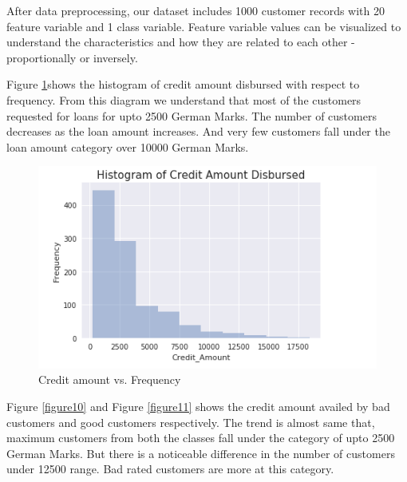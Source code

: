 \documentclass[sigconf]{acmart}
\begin{document}
After data preprocessing, our dataset includes 1000 customer records with 20 feature variable and 1 class variable. Feature variable values can be visualized to understand the characteristics and how they are related to each other - proportionally or inversely. 

Figure \ref{fig:Figure9}shows the histogram of credit amount disbursed with respect to frequency. From this diagram we understand that most of the customers requested for loans for upto 2500 German Marks. The number of customers decreases as the loan amount increases. And very few customers fall under the loan amount category over 10000 German Marks. 

\begin{figure}[htb]
  \centering
  \includegraphics[width=1.0\columnwidth]{images/Figure9.png}
  \caption{Credit amount vs. Frequency}
  \label{fig:Figure9} 
\end{figure}

Figure \ref{figure10} and Figure \ref{figure11} shows the credit amount availed by bad customers and good customers respectively. The trend is almost same that, maximum customers from both the classes fall under the category of upto 2500 German Marks. But there is a noticeable difference in the number of customers under 12500 range. Bad rated customers are more at this category.
\end{document}
